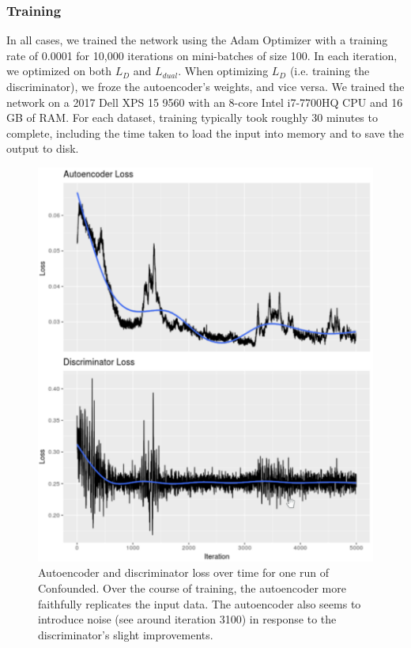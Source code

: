 \documentclass[notitlepage]{article}
\begin{document}
\subsubsection{Training}

In all cases, we trained the network using the Adam Optimizer \cite{kingma_adam_2014} with a training rate of 0.0001 for 10,000 iterations on mini-batches of size 100.
In each iteration, we optimized on both $L_D$ and $L_{dual}$.
When optimizing $L_D$ (i.e. training the discriminator), we froze the autoencoder's weights, and vice versa.
We trained the network on a 2017 Dell XPS 15 9560 with an 8-core Intel i7-7700HQ CPU and 16 GB of RAM.
For each dataset, training typically took roughly 30 minutes to complete, including the time taken to load the input into memory and to save the output to disk.

\begin{figure}
	\centering
	\includegraphics[width=\columnwidth]{figures/rough/training_loss.png}
	\caption{Autoencoder and discriminator loss over time for one run of Confounded.
	Over the course of training, the autoencoder more faithfully replicates the input data.
	The autoencoder also seems to introduce noise (see around iteration 3100) in response to the discriminator's slight improvements.}
	\label{fig:training_loss}
\end{figure}
\end{document}
